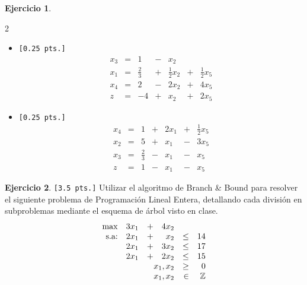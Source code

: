 \documentclass[a4paper,oneside,12pt]{amsart}
\theoremstyle{definition}
\newtheorem{quest}{Ejercicio}
\begin{document}
\begin{quest}
\begin{multicols}{2}
\begin{itemize}
\[\begin{array}{rrrrrrr}
                \end{array}
            \]
            \item[2)] \verb|[0.25 pts.]|
            \[
                \begin{array}{rrrrrrr}
                    x_3 & = & 1           &  - & x_2                &   &               \\
                    x_1 & = & \frac{2}{3} & + & \frac{1}{2}x_2 & + & \frac{1}{2}x_5 \\
                    x_4 & = & 2           & - & 2x_2           & + & 4x_5           \\ \hline
                    z   & = & -4          & + & x_2 & + & 2x_5
                \end{array}
            \]
            \item[4)] \verb|[0.25 pts.]|
            \[
                \begin{array}{rrrrrrr}
                    x_4 & = & 1           & + & 2x_1 & + & \frac{1}{2}x_5  \\
                    x_2 & = & 5           & + & x_1  & - & 3x_5 \\
                    x_3 & = & \frac{2}{3} & - & x_1  & - & x_5  \\ \hline
                    z   & = & 1           & - & x_1  & - & x_5
                \end{array}
            \]

        \end{itemize}
    \end{multicols}

\end{quest}


\begin{quest} 
\verb|[3.5 pts.]| Utilizar el algoritmo de Branch \& Bound para resolver el siguiente problema de Programación Lineal
Entera, detallando cada división en subproblemas mediante el esquema de árbol visto en clase.
\[\begin{array}{rrrrrrrrc}
\max & 3x_1 & + & 4x_2 &  &   \\
\text{s.a:}	 & 2x_1 & + & x_2 & \leq & 14  \\
			 & 2x_1 & + & 3x_2 & \leq & 17 \\
			 &2x_1 & +  & 2x_2 & \leq & 15 \\
			 &	\multicolumn{3}{r}{x_1,x_2} & \geq & 0 \\
			 & \multicolumn{3}{r}{x_1,x_2} & \in & \mathbb{Z}
\end{array}
\]
\end{quest}
\end{document}
